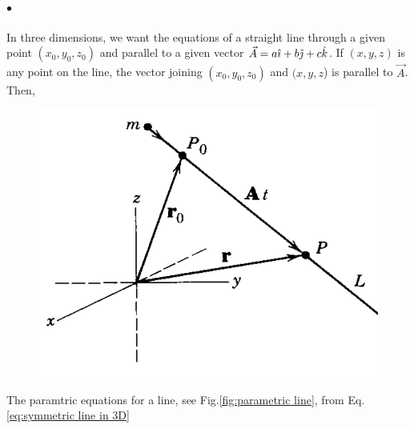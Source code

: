             \paragraph{$\bullet$} In three dimensions, we want the equations of
            a straight line through a given point $(x_0,y_0,z_0)$ and parallel to a given vector 
            $\vec{A} = a\hat{\imath}  + b\hat{\jmath}  + c\hat{k} $. If $(x,y,z)$ is any point on the line, the 
            vector joining $(x_0,y_0,z_0)$ and 
            $(x,y,z$) is parallel to $\vec{A}$. Then,
            \begin{figure}
                \label{fig:parametric line}
                \includegraphics[width=0.9\linewidth]{figures/parametric line.png}
                \caption{}
            \end{figure}
            The paramtric equations for a line, see Fig.\eqref{fig:parametric line}, from Eq.\eqref{eq:symmetric line in 3D}
    
